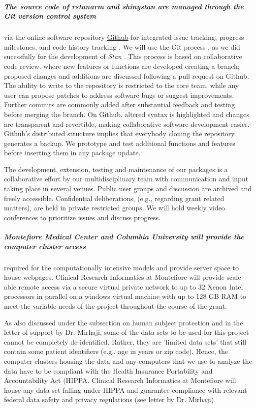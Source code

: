 \documentclass[11pt,notitlepage]{article}
\begin{document}
\subparagraph*{The source code of \textit{rstanarm} and \textit{shinystan} are managed through the Git version control system}
\cite{Chacon2009ProGit} via the online software repository \href{https://github.com/}{Github} for integrated issue tracking, 
progress milestones, and code history tracking \cite{loeliger2012version}. We will use the Git process \cite{Driessen2010successful}, 
as we did sucessfully for the development of \textit{Stan} \cite{Stan-manual:2015}. This  process is based on collaborative code review, 
where new features or functions are developed creating a branch; proposed changes and additions are discussed following a pull request on 
Github. The ability to write to the repository is restricted to the core team, while any user can propose patches to address software 
bugs or suggest improvements. Further commits are commonly added after substantial feedback and testing before merging the branch.  
On Github, altered syntax is highlighted and changes are transparent and revertible, making collaborative software development easier. 
Github's distributed structure implies that everybody cloning the repository generates a backup. We prototype and test additional 
functions and features before inserting them in any package update.

The development, extension, testing and maintenance of our packages is a collaborative effort by our multidisciplinary team with 
communication and input taking place in several venues. Public user groups and discussion are archived and freely accessible. 
Confidential deliberations, (e.g., regarding grant related matters), are held in private restricted groups. We will hold weekly video 
conferences to prioritize issues and discuss progress.

\subparagraph{Montefiore Medical Center and Columbia University will provide the computer cluster access} required for the computationally intensive 
models and provide server space to house webpages. Clinical Research Informatics at Montefiore will provide scale-able 
remote access via a secure virtual private network to up to 32 Xenon Intel processors in parallel on a windows virtual machine with up to 
128 GB RAM to meet the variable needs of the project throughout the course of the grant. 

As also discussed under the subsection on human subject protection and in the letter of support by Dr. Mirhaji, some of the data sets to 
be used for this project cannot be completely de-identified. Rather, they are 'limited data sets' that still contain some patient 
identifiers (e.g., age in years or zip code). Hence, the computer clusters housing the data and 
any computers that we use to analyze the data have to be compliant with the Health Insurance Portability and Accountability Act (HIPPA. 
Clinical Research Informatics at Montefiore will house any data set falling under HIPPA and 
guarantee compliance with relevant federal data safety and privacy regulations (see letter by Dr. Mirhaji). 
\end{document}
